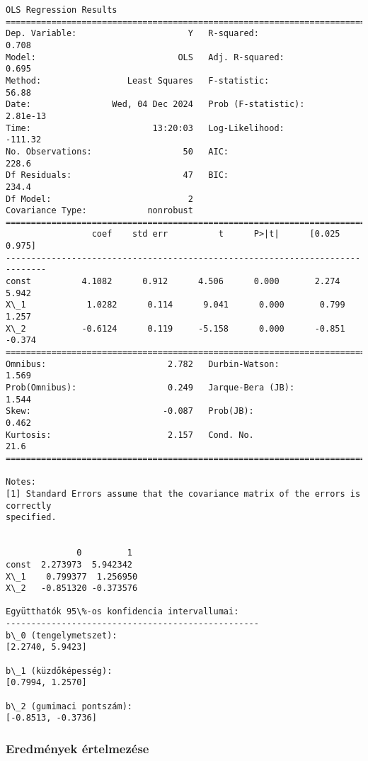 \documentclass[11pt]{article}
\begin{document}
    \begin{Verbatim}[commandchars=\\\{\}]
                            OLS Regression Results
==============================================================================
Dep. Variable:                      Y   R-squared:                       0.708
Model:                            OLS   Adj. R-squared:                  0.695
Method:                 Least Squares   F-statistic:                     56.88
Date:                Wed, 04 Dec 2024   Prob (F-statistic):           2.81e-13
Time:                        13:20:03   Log-Likelihood:                -111.32
No. Observations:                  50   AIC:                             228.6
Df Residuals:                      47   BIC:                             234.4
Df Model:                           2
Covariance Type:            nonrobust
==============================================================================
                 coef    std err          t      P>|t|      [0.025      0.975]
------------------------------------------------------------------------------
const          4.1082      0.912      4.506      0.000       2.274       5.942
X\_1            1.0282      0.114      9.041      0.000       0.799       1.257
X\_2           -0.6124      0.119     -5.158      0.000      -0.851      -0.374
==============================================================================
Omnibus:                        2.782   Durbin-Watson:                   1.569
Prob(Omnibus):                  0.249   Jarque-Bera (JB):                1.544
Skew:                          -0.087   Prob(JB):                        0.462
Kurtosis:                       2.157   Cond. No.                         21.6
==============================================================================

Notes:
[1] Standard Errors assume that the covariance matrix of the errors is correctly
specified.


              0         1
const  2.273973  5.942342
X\_1    0.799377  1.256950
X\_2   -0.851320 -0.373576

Együtthatók 95\%-os konfidencia intervallumai:
--------------------------------------------------
b\_0 (tengelymetszet):
[2.2740, 5.9423]

b\_1 (küzdőképesség):
[0.7994, 1.2570]

b\_2 (gumimaci pontszám):
[-0.8513, -0.3736]
    \end{Verbatim}

    \subsubsection{Eredmények
értelmezése}\label{eredmuxe9nyek-uxe9rtelmezuxe9se}
\end{document}
